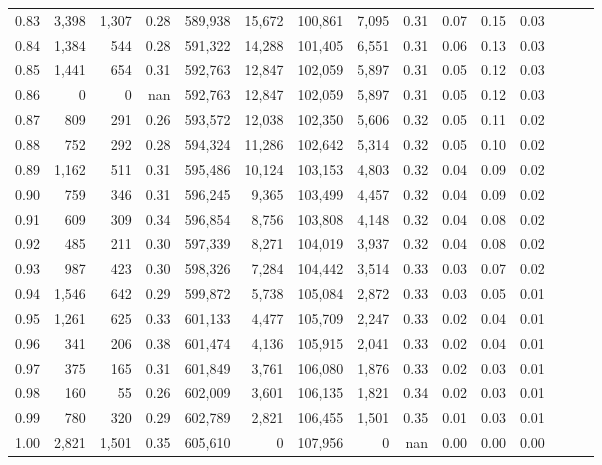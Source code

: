 \begin{tabular}{rrrrrrrrrrrrrrr}
0.83 &   3,398 &  1,307 &  0.28 &  589,938 &   15,672 &  100,861 &    7,095 &  0.31 &  0.07 &  0.15 &      0.03 \\
0.84 &   1,384 &    544 &  0.28 &  591,322 &   14,288 &  101,405 &    6,551 &  0.31 &  0.06 &  0.13 &      0.03 \\
0.85 &   1,441 &    654 &  0.31 &  592,763 &   12,847 &  102,059 &    5,897 &  0.31 &  0.05 &  0.12 &      0.03 \\
0.86 &       0 &      0 &   nan &  592,763 &   12,847 &  102,059 &    5,897 &  0.31 &  0.05 &  0.12 &      0.03 \\
0.87 &     809 &    291 &  0.26 &  593,572 &   12,038 &  102,350 &    5,606 &  0.32 &  0.05 &  0.11 &      0.02 \\
0.88 &     752 &    292 &  0.28 &  594,324 &   11,286 &  102,642 &    5,314 &  0.32 &  0.05 &  0.10 &      0.02 \\
0.89 &   1,162 &    511 &  0.31 &  595,486 &   10,124 &  103,153 &    4,803 &  0.32 &  0.04 &  0.09 &      0.02 \\
0.90 &     759 &    346 &  0.31 &  596,245 &    9,365 &  103,499 &    4,457 &  0.32 &  0.04 &  0.09 &      0.02 \\
0.91 &     609 &    309 &  0.34 &  596,854 &    8,756 &  103,808 &    4,148 &  0.32 &  0.04 &  0.08 &      0.02 \\
0.92 &     485 &    211 &  0.30 &  597,339 &    8,271 &  104,019 &    3,937 &  0.32 &  0.04 &  0.08 &      0.02 \\
0.93 &     987 &    423 &  0.30 &  598,326 &    7,284 &  104,442 &    3,514 &  0.33 &  0.03 &  0.07 &      0.02 \\
0.94 &   1,546 &    642 &  0.29 &  599,872 &    5,738 &  105,084 &    2,872 &  0.33 &  0.03 &  0.05 &      0.01 \\
0.95 &   1,261 &    625 &  0.33 &  601,133 &    4,477 &  105,709 &    2,247 &  0.33 &  0.02 &  0.04 &      0.01 \\
0.96 &     341 &    206 &  0.38 &  601,474 &    4,136 &  105,915 &    2,041 &  0.33 &  0.02 &  0.04 &      0.01 \\
0.97 &     375 &    165 &  0.31 &  601,849 &    3,761 &  106,080 &    1,876 &  0.33 &  0.02 &  0.03 &      0.01 \\
0.98 &     160 &     55 &  0.26 &  602,009 &    3,601 &  106,135 &    1,821 &  0.34 &  0.02 &  0.03 &      0.01 \\
0.99 &     780 &    320 &  0.29 &  602,789 &    2,821 &  106,455 &    1,501 &  0.35 &  0.01 &  0.03 &      0.01 \\
1.00 &   2,821 &  1,501 &  0.35 &  605,610 &        0 &  107,956 &        0 &   nan &  0.00 &  0.00 &      0.00 \\
\bottomrule
\end{tabular}
